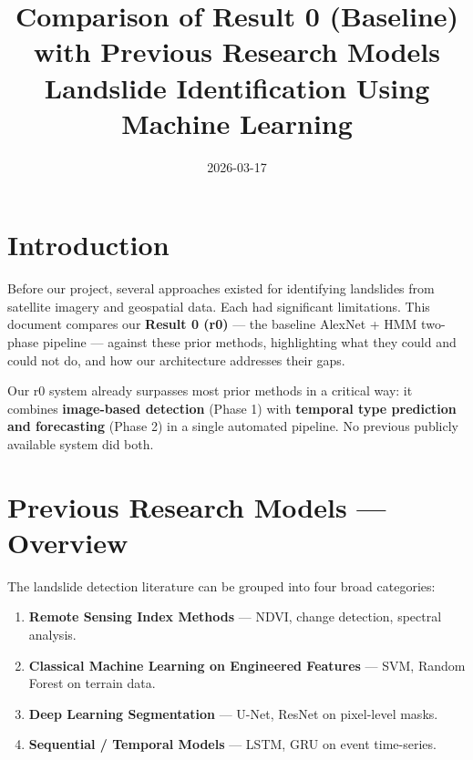 \documentclass[11pt]{article}
\title{Comparison of Result 0 (Baseline) with Previous Research Models\\[0.3em]
\large Landslide Identification Using Machine Learning}
\author{}
\date{2026-03-17}
\begin{document}
\maketitle
\tableofcontents
\newpage

\section{Introduction}

Before our project, several approaches existed for identifying landslides from satellite imagery and geospatial data. Each had significant limitations. This document compares our \textbf{Result 0 (r0)} --- the baseline AlexNet + HMM two-phase pipeline --- against these prior methods, highlighting what they could and could not do, and how our architecture addresses their gaps.

Our r0 system already surpasses most prior methods in a critical way: it combines \textbf{image-based detection} (Phase 1) with \textbf{temporal type prediction and forecasting} (Phase 2) in a single automated pipeline. No previous publicly available system did both.

\section{Previous Research Models --- Overview}

The landslide detection literature can be grouped into four broad categories:

\begin{enumerate}
    \item \textbf{Remote Sensing Index Methods} --- NDVI, change detection, spectral analysis.
    \item \textbf{Classical Machine Learning on Engineered Features} --- SVM, Random Forest on terrain data.
    \item \textbf{Deep Learning Segmentation} --- U-Net, ResNet on pixel-level masks.
    \item \textbf{Sequential / Temporal Models} --- LSTM, GRU on event time-series.
\end{enumerate}

\end{document}
